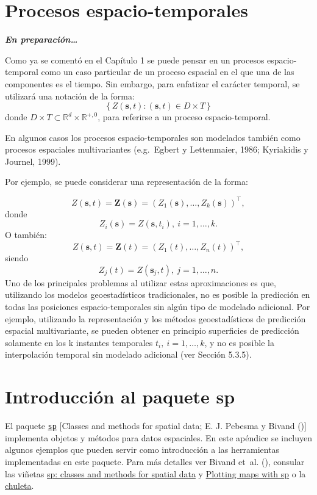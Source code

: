 \documentclass[
]{book}
\theoremstyle{break}
\theoremstyle{definition}
\theoremstyle{definition}
\theoremstyle{definition}
\theoremstyle{definition}
\theoremstyle{remark}
\begin{document}
\chapter{Procesos espacio-temporales}\label{esp-temp}

\textbf{\emph{En preparación\ldots{}}}

Como ya se comentó en el Capítulo 1 se puede pensar en un procesos espacio-temporal como un caso particular de un proceso espacial en el que una de las componentes es el tiempo.
Sin embargo, para enfatizar el carácter temporal, se utilizará una notación de la forma:
\[\left\{ Z(\mathbf{s},t):(\mathbf{s},t)\in D\times T\right\}\]
donde \(D\times T\subset \mathbb{R} ^{d} \times \mathbb{R}^{+,0}\), para
referirse a un proceso espacio-temporal.

En algunos casos los procesos espacio-temporales son modelados también
como procesos espaciales multivariantes (e.g.~Egbert y Lettenmaier,
1986; Kyriakidis y Journel, 1999).

Por ejemplo, se puede considerar una representación de la forma:

\[Z(\mathbf{s},t)=\mathbf{Z}(\mathbf{s})=(Z_{1} (\mathbf{s}), \ldots,Z_{k} (
\mathbf{s}))^\top,\]
donde
\[Z_{i} (\mathbf{s})=Z(\mathbf{s},t_{i} ),\  i=1, \ldots,k.\]
O también:
\[Z(\mathbf{s},t) = \mathbf{Z}(t) =  \left(Z_{1}(t), \ldots, Z_{n}(t) \right)^\top,\]
siendo
\[Z_{j} (t)=Z(\mathbf{s}_{j} ,t),\  j=1, \ldots,n.\]
Uno de los principales problemas al utilizar estas aproximaciones es que, utilizando los modelos geoestadísticos tradicionales, no es posible la
predicción en todas las posiciones espacio-temporales sin algún tipo de
modelado adicional. Por ejemplo, utilizando la representación y los métodos geoestadísticos de predicción espacial multivariante, se pueden obtener en principio superficies de predicción solamente en los k instantes temporales \(t_{i} ,\  i=1, \ldots, k\),
y no es posible la interpolación temporal sin modelado adicional (ver Sección 5.3.5).

\appendix


\chapter{\texorpdfstring{Introducción al paquete \textbf{sp}}{Introducción al paquete sp}}\label{intro-sp}

El paquete \href{https://CRAN.R-project.org/package=sp}{\texttt{sp}} {[}Classes and methods for spatial data; E. J. Pebesma y Bivand (){]} implementa objetos y métodos para datos espaciales.
En este apéndice se incluyen algunos ejemplos que pueden servir como introducción a las herramientas implementadas en este paquete.
Para más detalles ver Bivand et~al. (), consular las viñetas \href{https://cran.r-project.org/web/packages/sp/vignettes/intro_sp.pdf}{sp: classes and methods for spatial data} y \href{https://edzer.github.io/sp}{Plotting maps with sp} o la \href{https://www.maths.lancs.ac.uk/~rowlings/Teaching/UseR2012/cheatsheet.html}{chuleta}.
\end{document}
